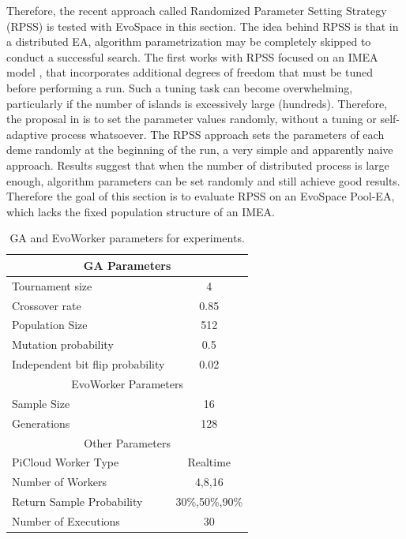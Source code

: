 Therefore, the recent approach called Randomized Parameter Setting Strategy (RPSS) \cite{fuku1,fuku2} is tested with EvoSpace in this section.
The idea behind RPSS is that in a distributed EA, algorithm parametrization may be completely skipped to conduct a successful search.
The first works with RPSS focused on an IMEA model \cite{fuku1,fuku2}, that incorporates additional degrees of freedom that must be tuned before
performing a run.
Such a tuning task can become overwhelming, particularly if the number of islands is excessively large (hundreds).
Therefore, the proposal in \cite{fuku1} is to set the parameter values randomly, without a tuning or self-adaptive process whatsoever.
The RPSS approach sets the parameters of each deme randomly at the beginning of the run, a very simple and apparently naive approach.
Results suggest that when the number of distributed process is large enough, algorithm parameters can be set randomly and still achieve
good results.
Therefore the goal of this section is to evaluate RPSS on an EvoSpace Pool-EA, which lacks the fixed population structure of an IMEA.

\begin{table}[!t]
\renewcommand{\arraystretch}{1.3}
\caption{GA and EvoWorker parameters for experiments.}
\label{tab:params}
\centering
\begin{tabular}{|l|c|}
\hline
\multicolumn{2}{|c|}{GA Parameters} \\
\hline
Tournament size & 4 \\
Crossover rate & 0.85  \\
Population Size & 512 \\
Mutation probability & 0.5 \\
Independent bit flip probability  & 0.02 \\
\hline
\multicolumn{2}{|c|}{EvoWorker Parameters} \\
\hline
Sample Size & 16 \\
Generations & 128 \\
\hline
\multicolumn{2}{|c|}{Other Parameters} \\
\hline
PiCloud Worker Type & Realtime \\
Number of Workers & 4,8,16 \\
Return Sample Probability & 30\%,50\%,90\% \\
Number of Executions & 30 \\

\hline

\end{tabular}
\end{table}

